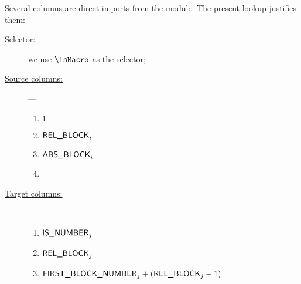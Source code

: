 Several columns are direct imports from the \btcMod{} module.
The present lookup justifies them:
\begin{description}
	\item[\underline{Selector:}]
		we use $\isMacro$ as the selector;
	\item[\underline{Source columns:}] ---
		\begin{enumerate}
			\item $1$
			\item $\textsf{REL\_BLOCK}        _{i}$
			\item $\textsf{ABS\_BLOCK}        _{i}$
			\item[\vspace{\fill}]
		\end{enumerate}
	\item[\underline{Target columns:}] ---
		\begin{enumerate}
			\item $\textsf{IS\_NUMBER} _{j}$
			\item $\textsf{REL\_BLOCK} _{j}$
			\item $\textsf{FIRST\_BLOCK\_NUMBER} _{j} + (\textsf{REL\_BLOCK} _{j} - 1)$
		\end{enumerate}
\end{description}

